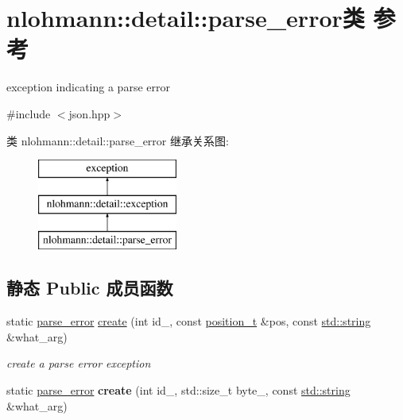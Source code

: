 \hypertarget{classnlohmann_1_1detail_1_1parse__error}{}\section{nlohmann\+::detail\+::parse\+\_\+error类 参考}
\label{classnlohmann_1_1detail_1_1parse__error}


exception indicating a parse error  




{\ttfamily \#include $<$json.\+hpp$>$}

类 nlohmann\+::detail\+::parse\+\_\+error 继承关系图\+:\begin{figure}[H]
\begin{center}
\leavevmode
\includegraphics[height=3.000000cm]{classnlohmann_1_1detail_1_1parse__error}
\end{center}
\end{figure}
\subsection*{静态 Public 成员函数}
\begin{DoxyCompactItemize}
\item 
static \mbox{\hyperlink{classnlohmann_1_1detail_1_1parse__error}{parse\+\_\+error}} \mbox{\hyperlink{classnlohmann_1_1detail_1_1parse__error_a137ea4d27de45d8a844fd13451d40f3d}{create}} (int id\+\_\+, const \mbox{\hyperlink{structnlohmann_1_1detail_1_1position__t}{position\+\_\+t}} \&pos, const \mbox{\hyperlink{namespacenlohmann_1_1detail_a1ed8fc6239da25abcaf681d30ace4985ab45cffe084dd3d20d928bee85e7b0f21}{std\+::string}} \&what\+\_\+arg)
\begin{DoxyCompactList}\small\item\em create a parse error exception \end{DoxyCompactList}\item 
\mbox{\label{classnlohmann_1_1detail_1_1parse__error_a9fd60ad6bce80fd99686ad332faefd37}} 
static \mbox{\hyperlink{classnlohmann_1_1detail_1_1parse__error}{parse\+\_\+error}} {\bfseries create} (int id\+\_\+, std\+::size\+\_\+t byte\+\_\+, const \mbox{\hyperlink{namespacenlohmann_1_1detail_a1ed8fc6239da25abcaf681d30ace4985ab45cffe084dd3d20d928bee85e7b0f21}{std\+::string}} \&what\+\_\+arg)
\end{DoxyCompactItemize}
